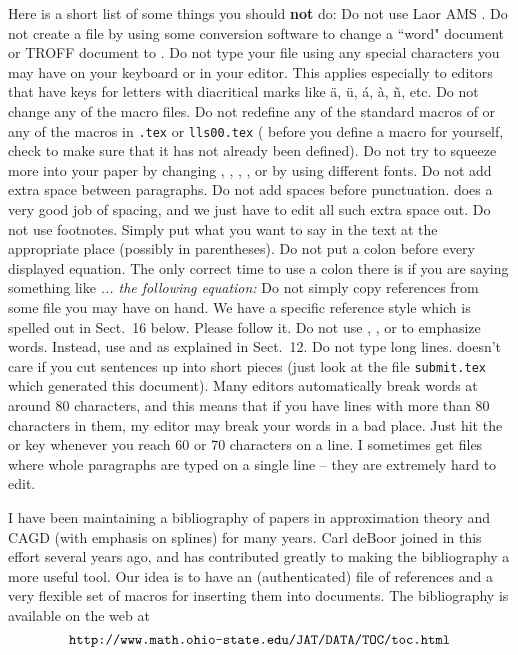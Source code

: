 Here is a short list of some things you should {\bf not} do:
\ms
\bull Do not use La\Tex or AMS \Tex.
\sm
\bull Do not create a \Tex file by using some conversion software
to change a ``word" document or TROFF document to \Tex.
\sm
\bull Do not type your \Tex file using any special characters
you may have on your keyboard or in your editor.  This applies
especially to editors that have keys for letters with diacritical
marks like \"a, \"u, \'a, \`a, \~n, etc.
\sm
\bull Do not change any of the macro files.
\sm
\bull Do not redefine any of the standard macros of \Tex
or any of the macros in {\tt \macname.tex} or {\tt lls00.tex}
(\ie{} before you define a macro for yourself, 
check to make sure that it has not already been defined).
\sm
\bull Do not try to squeeze more into your paper by changing
, , , ,
or by using different fonts.
\sm
\bull Do not add extra space between paragraphs.
\sm
\bull Do not add spaces before punctuation.  \Tex does a very
  good job of spacing, and we just have to edit all such extra
  space out.
\sm
\bull Do not use footnotes.  Simply put what you want to say in
  the text at the appropriate place (possibly in parentheses).
\sm
\bull Do not put a colon before every displayed equation.  The
  only correct time to use a colon there is if you are saying
  something like {\sl ... the following equation:}
\sm
\bull Do not simply copy references from some file you may have
  on hand.  We have a specific reference style which is spelled
  out in Sect.~16 below. Please follow it.
\sm
\bull Do not use , , or  to emphasize words.
Instead, use  and  as explained in
Sect.~12.
\sm
\bull Do not type long lines. \Tex doesn't care if you cut sentences
up into short pieces (just look at the file {\tt submit.tex} which
generated this document).  Many editors automatically break words
at around 80 characters, and this means that if you have lines with
more than 80 characters in them, my editor may break your words in
a bad place.  Just hit the  or  key
whenever you reach 60 or 70 characters on a line.  I sometimes get
files where whole paragraphs are typed on a single line -- they are
extremely hard to edit.

I have been maintaining a bibliography of papers in approximation
theory and CAGD (with emphasis on splines) for many years.
Carl de\thinspace{}Boor joined
in this effort several years ago, and has contributed greatly
to making the bibliography a more useful tool.  Our idea is
to have an (authenticated) file of references
and a very flexible set of
\Tex macros for inserting them into \Tex documents.
The bibliography is available on the web at
$$\hbox{\tt http://www.math.ohio-state.edu/JAT/DATA/TOC/toc.html}$$

